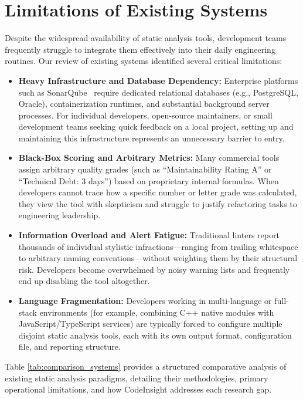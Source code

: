 \section{Limitations of Existing Systems}
Despite the widespread availability of static analysis tools, development teams frequently struggle to integrate them effectively into their daily engineering routines. Our review of existing systems identified several critical limitations:
\begin{itemize}
    \item \textbf{Heavy Infrastructure and Database Dependency:} Enterprise platforms such as SonarQube~\cite{sonarqube} require dedicated relational databases (e.g., PostgreSQL, Oracle), containerization runtimes, and substantial background server processes. For individual developers, open-source maintainers, or small development teams seeking quick feedback on a local project, setting up and maintaining this infrastructure represents an unnecessary barrier to entry.
    \item \textbf{Black-Box Scoring and Arbitrary Metrics:} Many commercial tools assign arbitrary quality grades (such as ``Maintainability Rating A'' or ``Technical Debt: 3 days'') based on proprietary internal formulas. When developers cannot trace how a specific number or letter grade was calculated, they view the tool with skepticism and struggle to justify refactoring tasks to engineering leadership.
    \item \textbf{Information Overload and Alert Fatigue:} Traditional linters report thousands of individual stylistic infractions—ranging from trailing whitespace to arbitrary naming conventions—without weighting them by their structural risk. Developers become overwhelmed by noisy warning lists and frequently end up disabling the tool altogether.
    \item \textbf{Language Fragmentation:} Developers working in multi-language or full-stack environments (for example, combining C++ native modules with JavaScript/TypeScript services) are typically forced to configure multiple disjoint static analysis tools, each with its own output format, configuration file, and reporting structure.
\end{itemize}

Table \ref{tab:comparison_systems} provides a structured comparative analysis of existing static analysis paradigms, detailing their methodologies, primary operational limitations, and how CodeInsight addresses each research gap.

